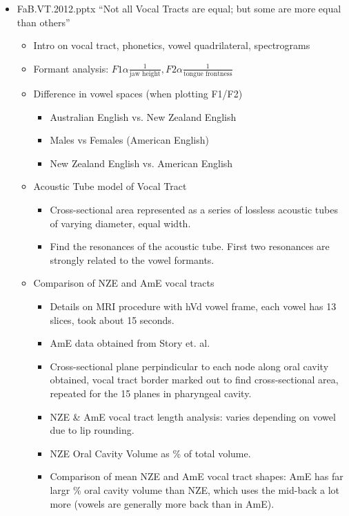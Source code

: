 \documentclass{article}
\begin{document}
\begin{itemize}
\begin{itemize}
        \item FaB.VT.2012.pptx ``Not all Vocal Tracts are equal; but some are more equal than others''
        \begin{itemize}
            \item Intro on vocal tract, phonetics, vowel quadrilateral, spectrograms
            \item Formant analysis: $F1 \alpha \frac{1}{\text{jaw height}}, F2 \alpha \frac{1}{\text{tongue frontness}}$
            \item Difference in vowel spaces (when plotting F1/F2)
            \begin{itemize}
                \item Australian English vs. New Zealand English
                \item Males vs Females (American English)
                \item New Zealand English vs. American English
            \end{itemize}
            \item Acoustic Tube model of Vocal Tract
            \begin{itemize}
                \item Cross-sectional area represented as a series of lossless acoustic tubes of varying diameter, equal width.
                \item Find the resonances of the acoustic tube. First two resonances are strongly related to the vowel formants.
            \end{itemize}
            \item Comparison of NZE and AmE vocal tracts
            \begin{itemize}
                \item Details on MRI procedure with hVd vowel frame, each vowel has 13 slices, took about 15 seconds.
                \item AmE data obtained from Story et. al. 
                \item Cross-sectional plane perpindicular to each node along oral cavity obtained, vocal tract border marked out to find cross-sectional area, repeated for the 15 planes in pharyngeal cavity.
                \item NZE \& AmE vocal tract length analysis: varies depending on vowel due to lip rounding. 
                \item NZE Oral Cavity Volume as \% of total volume.
                \item Comparison of mean NZE and AmE vocal tract shapes: AmE has far largr \% oral cavity volume than NZE, which uses the mid-back a lot more (vowels are generally more back than in AmE).
            \end{itemize}
        \end{itemize}
        

\end{itemize}
\end{itemize}
\end{document}
